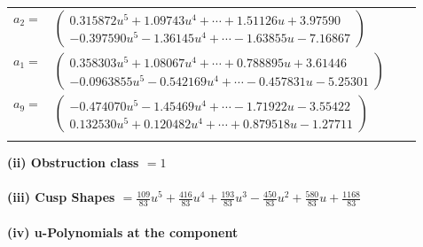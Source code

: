 \documentclass[1p]{elsarticle_modified}
\theoremstyle{definition}
\begin{document}
\begin{tabular}{m{7pt} m{180pt} m{7pt} m{180pt} }
\flushright $a_{2}=$&$\begin{pmatrix}0.315872 u^{5}+1.09743 u^{4}+\cdots+1.51126 u+3.97590\\-0.397590 u^{5}-1.36145 u^{4}+\cdots-1.63855 u-7.16867\end{pmatrix}$ \\
\flushright $a_{1}=$&$\begin{pmatrix}0.358303 u^{5}+1.08067 u^{4}+\cdots+0.788895 u+3.61446\\-0.0963855 u^{5}-0.542169 u^{4}+\cdots-0.457831 u-5.25301\end{pmatrix}$ \\
\flushright $a_{9}=$&$\begin{pmatrix}-0.474070 u^{5}-1.45469 u^{4}+\cdots-1.71922 u-3.55422\\0.132530 u^{5}+0.120482 u^{4}+\cdots+0.879518 u-1.27711\end{pmatrix}$\\&\end{tabular}
\flushleft \textbf{(ii) Obstruction class $= 1$}\\~\\
\flushleft \textbf{(iii) Cusp Shapes $= \frac{109}{83} u^5+\frac{416}{83} u^4+\frac{193}{83} u^3-\frac{450}{83} u^2+\frac{580}{83} u+\frac{1168}{83}$}\\~\\
\newpage\renewcommand{\arraystretch}{1}
\flushleft \textbf{(iv) u-Polynomials at the component}\newline \\
\end{document}
